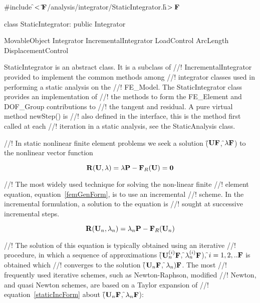 
\indent \#include \f$<\tilde{ }{\bf F}$/analysis/integrator/StaticIntegrator.h\f$>{\bf F}$

\indent class StaticIntegrator: public Integrator

\indent MovableObject
\indent\indent Integrator
\indent\indent\indent IncrementalIntegrator
\indent\indent\indent{}
\indent\indent\indent\indent\indent LoadControl
\indent\indent\indent\indent\indent ArcLength
\indent\indent\indent\indent\indent DisplacementControl

\indent StaticIntegrator is an abstract class. It is a subclass of
//! IncrementalIntegrator provided to implement the common methods among
//! integrator classes used in performing a static analysis on the
//! FE\_Model. The StaticIntegrator class provides an implementation of
//! the methods to form the FE\_Element and DOF\_Group contributions to
//! the tangent and residual. A pure virtual method newStep() is
//! also defined in the interface, this is the method first called at each
//! iteration in a static analysis, see the StaticAnalysis class.

//! In static nonlinear finite element problems we seek a solution
(\f$\mathbf{U}{\bf F}$, \f$\lambda{\bf F}$) to the nonlinear vector function

\begin{equation}
{\bf R}({\bf U}, \lambda) = \lambda {\bf P} - {\bf F}_R({\bf U}) = {\bf 0}
\label{staticGenForm}
\end{equation}

//! The most widely used technique for solving the non-linear finite
//! element equation, equation~\ref{femGenForm}, is to use an incremental
//! scheme. In the incremental formulation, a solution to the equation is
//! sought at successive incremental steps.  

\begin{equation}
{\bf R}({\bf U}_{n}, \lambda_n) = \lambda_n {\bf P} - {\bf F}_R({\bf U}_{n})
\label{staticIncForm}
\end{equation}

//! The solution of this equation is typically obtained using an iterative
//! procedure, in which a sequence of approximations
(\f${\bf U}_{n}^{(i)}{\bf F}$, \f$\lambda_n^{(i)}{\bf F}$), \f$i=1,2, ..{\bf F}$ is obtained which
//! converges to the solution (\f${\bf U}_n{\bf F}$, \f$\lambda_n){\bf F}$. The most
//! frequently used iterative schemes, such as Newton-Raphson, modified
//! Newton, and quasi Newton schemes, are based on a Taylor expansion of
//! equation~\ref{staticIncForm} about (\f${\bf U}_{n}{\bf F}$, \f$\lambda_n{\bf F}$):     

